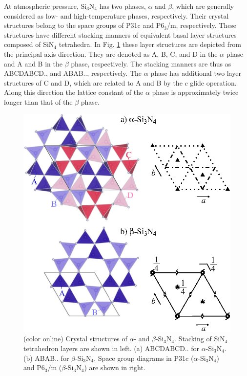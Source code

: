 \documentclass[twocolumn,amsmath,amssymb,a4paper,prb,superscriptaddress,floatfix]{revtex4-1}
\begin{document}
At atmospheric pressure, Si$_3$N$_4$ has two phases, $\alpha$ and $\beta$, which
are generally considered as low- and high-temperature phases,
respectively.\cite{zhou,hirosaki-md,riley} Their crystal structures belong to
the space groups of P31c and P6$_3$/m, respectively.\cite{yashima,boulay} These
structures have different stacking manners of equivalent basal layer structures
composed of SiN$_4$ tetrahedra.\cite{hampshire} In Fig. \ref{fig:Fig1_cryst}
these layer structures are depicted from the principal axis direction. They are
denoted as A, B, C, and D in the $\alpha$ phase and A and B in the $\beta$
phase, respectively. The stacking manners are thus as ABCDABCD.. and ABAB..,
respectively.  The $\alpha$ phase has additional two layer structures of C and
D, which are related to A and B by the $c$ glide operation.\cite{hampshire}
Along this direction the lattice constant of the $\alpha$ phase is approximately
twice longer than that of the
$\beta$ phase.
\begin{figure}[ht]
 \begin{center}
  \includegraphics[width=0.90\linewidth]{Fig1_crystal_str2.eps} \caption{(color
  online) Crystal structures of $\alpha$- and $\beta$-Si$_3$N$_4$. Stacking of
  SiN$_4$ tetrahedron layers are shown in left. (a) ABCDABCD.. for
  $\alpha$-Si$_3$N$_4$. (b) ABAB.. for $\beta$-Si$_3$N$_4$.  Space group
  diagrams\cite{inttableA} in P31c ($\alpha$-Si$_3$N$_4$) and P6$_3$/m ($\beta$-Si$_3$N$_4$)
  are shown in right.}
  \label{fig:Fig1_cryst} 
 \end{center}
\end{figure}
\end{document}
